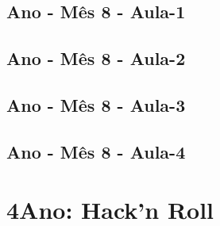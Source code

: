 \begin{multicols}{2}
\section[\sffamily 3\textordmasculine\space Ano - M\^{e}s 8 - Aula-1]{\textordmasculine\space Ano - M\^{e}s 8 - Aula-1}


\section[\sffamily 3\textordmasculine\space Ano - M\^{e}s 8 - Aula-2]{\textordmasculine\space Ano - M\^{e}s 8 - Aula-2}


\section[\sffamily 3\textordmasculine\space Ano - M\^{e}s 8 - Aula-3]{\textordmasculine\space Ano - M\^{e}s 8 - Aula-3}


\section[\sffamily 3\textordmasculine\space Ano - M\^{e}s 8 - Aula-4]{\textordmasculine\space Ano - M\^{e}s 8 - Aula-4}


\end{multicols}
\chapter[ 4\textordmasculine\space Ano: Hack'n Roll]{4\textordmasculine\space Ano: Hack'n Roll}



\pagebreak

%

\pagebreak

